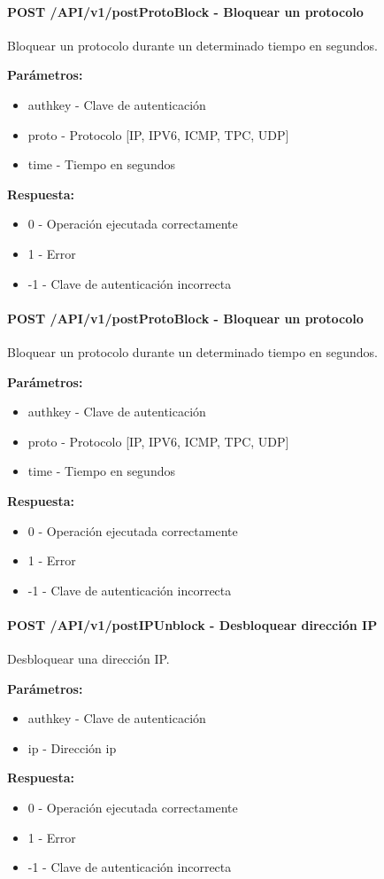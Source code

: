 \paragraph{\textbf{POST} /API/v1/postProtoBlock - Bloquear un protocolo}
Bloquear un protocolo durante un determinado tiempo en segundos.

\textbf{Parámetros:}

\begin{itemize}
\item authkey - Clave de autenticación
\item proto - Protocolo [IP, IPV6, ICMP, TPC, UDP]
\item time - Tiempo en segundos
\end{itemize}
\textbf{Respuesta:}
\begin{itemize}
\item 0 - Operación ejecutada correctamente
\item 1 - Error
\item -1 - Clave de autenticación incorrecta
\end{itemize}
\paragraph{\textbf{POST} /API/v1/postProtoBlock - Bloquear un protocolo}
Bloquear un protocolo durante un determinado tiempo en segundos.

\textbf{Parámetros:}

\begin{itemize}
\item authkey - Clave de autenticación
\item proto - Protocolo [IP, IPV6, ICMP, TPC, UDP]
\item time - Tiempo en segundos
\end{itemize}
\textbf{Respuesta:}
\begin{itemize}
\item 0 - Operación ejecutada correctamente
\item 1 - Error
\item -1 - Clave de autenticación incorrecta
\end{itemize}
\paragraph{\textbf{POST} /API/v1/postIPUnblock - Desbloquear dirección IP}
Desbloquear una dirección IP.

\textbf{Parámetros:}

\begin{itemize}
\item authkey - Clave de autenticación
\item ip - Dirección ip
\end{itemize}
\textbf{Respuesta:}
\begin{itemize}
\item 0 - Operación ejecutada correctamente
\item 1 - Error
\item -1 - Clave de autenticación incorrecta
\end{itemize}
